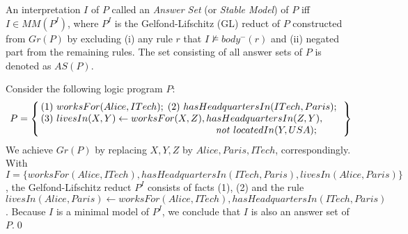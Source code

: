 An interpretation $I$ of $P$ called an \textit{Answer Set} (or \textit{Stable Model}) of $P$ iff  $I \in MM(P^I)$, where $P^I$ is the Gelfond-Lifschitz (GL) reduct of $P$ constructed from $Gr(P)$ by excluding 
(i) any rule $r$ that $I \not\models body^-(r)$ and (ii) negated part from the remaining rules. The set consisting of all answer sets of $P$ is denoted as $AS(P)$.
\begin{example}
Consider the following logic program $P$:
\begin{align*}
P = \left\{
           \begin{array}{@{\,}l@{~~}l@{}}
              \mbox{(1) }worksFor(Alice, ITech);\;
              \mbox{(2) }hasHeadquartersIn(ITech,Paris);\\
              \mbox{(3) }livesIn(X,Y) \leftarrow worksFor(X,Z), hasHeadquartersIn(Z,Y),\\
              \hspace{18em}\naf locatedIn(Y,USA);
            \end{array}
            \right\}
\end{align*}
We achieve $Gr(P)$ by replacing $X,Y,Z$ by $Alice, Paris, ITech$, correspondingly. With $I = \{worksFor(Alice, ITech), hasHeadquartersIn(ITech,Paris), livesIn(Alice, Paris)\}$, the Gelfond-Lifschitz reduct $P^I$ consists of facts (1), (2) and the rule $livesIn(Alice,Paris) \leftarrow worksFor(Alice,ITech), hasHeadquartersIn(ITech,Paris)$. Because $I$ is a minimal model of $P^I$, we conclude that $I$ is also an answer set of $P$.\qed
\end{example}


